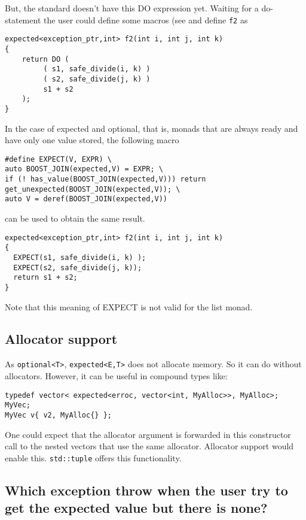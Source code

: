 \documentclass[a4paper,10pt]{article}
\newcommand{\cpp}[1]{\lstinline{#1}}
\begin{document}
But, the standard doesn't have this DO expression yet.
Waiting for a do-statement the user could define some macros (see \cite{monad_do_poc} and define \cpp{f2} as

\begin{lstlisting}
expected<exception_ptr,int> f2(int i, int j, int k)
{
    return DO (
         ( s1, safe_divide(i, k) )
         ( s2, safe_divide(j, k) )
         s1 + s2 
    );
}
\end{lstlisting}

In the case of expected and optional, that is, monads that are always ready and have only one value stored, the following macro 

\begin{lstlisting}
#define EXPECT(V, EXPR) \
auto BOOST_JOIN(expected,V) = EXPR; \
if (! has_value(BOOST_JOIN(expected,V))) return get_unexpected(BOOST_JOIN(expected,V)); \
auto V = deref(BOOST_JOIN(expected,V))
\end{lstlisting}

can be used to obtain the same result.

\begin{lstlisting}
expected<exception_ptr,int> f2(int i, int j, int k)
{
  EXPECT(s1, safe_divide(i, k) );
  EXPECT(s2, safe_divide(j, k));
  return s1 + s2;
}
\end{lstlisting}

Note that this meaning of EXPECT is not valid for the list monad. 

\subsection{Allocator support}

As \cpp{optional<T>},  \cpp{expected<E,T>} does not allocate memory. So it can do without allocators. However, it can be useful in compound types like:

\begin{lstlisting}
typedef vector< expected<erroc, vector<int, MyAlloc>>, MyAlloc>; MyVec;
MyVec v{ v2, MyAlloc{} };
\end{lstlisting}

One could expect that the allocator argument is forwarded in this constructor call to the nested vectors that use the same allocator. Allocator support would enable this. \cpp{std::tuple} offers this functionality.

\subsection{Which exception throw when the user try to get the expected value but there is none?}
\end{document}
